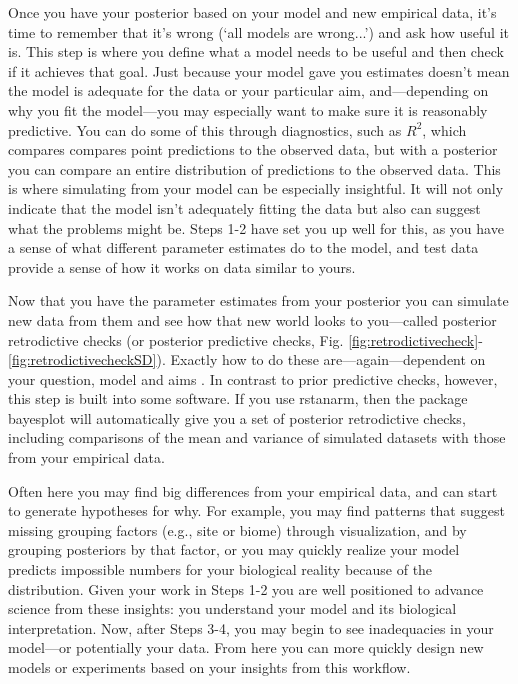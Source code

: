 \documentclass[11pt]{article}
\begin{document}
Once you have your posterior based on your model and new empirical data, it's time to remember that it's wrong (`all models are wrong...') and ask how useful it is. This step is where you define what a model needs to be useful and then check if it achieves that goal. Just because your model gave you estimates doesn't mean the model is adequate for the data or your particular aim, and---depending on why you fit the model---you may especially want to make sure it is reasonably predictive. You can do some of this through diagnostics, such as $R^2$, which compares compares point predictions to the observed  data, but with a posterior you can compare an entire distribution of predictions to the observed data. This is where simulating from your model can be especially insightful. It will not only indicate that the model isn't adequately fitting the data but also can suggest what the problems might be. Steps 1-2 have set you up well for this, as you have a sense of what different parameter estimates do to the model, and test data provide a sense of how it works on data similar to yours.

Now that you have the parameter estimates from your posterior you can simulate new data from them and see how that new world looks to you---called posterior retrodictive checks (or posterior predictive checks, Fig. \ref{fig:retrodictivecheck}-\ref{fig:retrodictivecheckSD}). Exactly how to do these are---again---dependent on your question, model and aims \citep[but there is lots written on this,][]{held2010,gelman200ppc,conn2018}. In contrast to prior predictive checks, however, this step is built into some software. If you use \textsf{rstanarm}, then the package \textsf{bayesplot} will automatically give you a set of posterior retrodictive checks, including comparisons of the mean and variance of simulated datasets with those from your empirical data. 

Often here you may find big differences from your empirical data, and can start to generate hypotheses for why. For example, you may find patterns that suggest missing grouping factors (e.g., site or biome) through visualization, and by grouping posteriors by that factor, or you may quickly realize your model predicts impossible numbers for your biological reality because of the distribution. Given your work in Steps 1-2 you are well positioned to advance science from these insights: you understand your model and its biological interpretation. Now, after Steps 3-4, you may begin to see inadequacies in your model---or potentially your data. From here you can more quickly design new models or experiments based on your insights from this workflow. 
\end{document}
